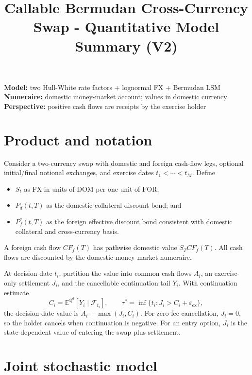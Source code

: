 \documentclass[conference]{IEEEtran}
\title{Callable Bermudan Cross-Currency Swap - Quantitative Model Summary (V2)}
\author{\TGIRArticleAuthorBlock}
\newcommand{\Qd}{\mathbb{Q}^{d}}
\newcommand{\E}{\mathbb{E}}
\newcommand{\F}{\mathcal{F}}
\newcommand{\DOM}{\ensuremath{\mathrm{DOM}}}
\newcommand{\FOR}{\ensuremath{\mathrm{FOR}}}
\begin{document}
\maketitle

\noindent\textbf{Model:} two Hull-White rate factors + lognormal FX + Bermudan LSM\\
\textbf{Numeraire:} domestic money-market account; values in domestic currency\\
\textbf{Perspective:} positive cash flows are receipts by the exercise holder

\section{Product and notation}

Consider a two-currency swap with domestic and foreign cash-flow legs, optional initial/final notional exchanges, and exercise dates $t_1<\cdots<t_M$. Define
\begin{itemize}
  \item $S_t$ as FX in units of \DOM{} per one unit of \FOR{};
  \item $P_d(t,T)$ as the domestic collateral discount bond; and
  \item $P_f^{*}(t,T)$ as the foreign effective discount bond consistent with domestic collateral and cross-currency basis.
\end{itemize}
A foreign cash flow $CF_f(T)$ has pathwise domestic value $S_TCF_f(T)$. All cash flows are discounted by the domestic money-market numeraire.

At decision date $t_i$, partition the value into common cash flows $A_i$, an exercise-only settlement $J_i$, and the cancellable continuation tail $Y_i$. With continuation estimate
\[
  C_i=\E^{\Qd}\!\left[Y_i\mid\F_{t_i}\right],
  \qquad
  \tau^*=\inf\{t_i:J_i>C_i+\varepsilon_{\mathrm{ex}}\},
\]
the decision-date value is $A_i+\max(J_i,C_i)$. For zero-fee cancellation, $J_i=0$, so the holder cancels when continuation is negative. For an entry option, $J_i$ is the state-dependent value of entering the swap plus settlement.

\section{Joint stochastic model}
\end{document}
